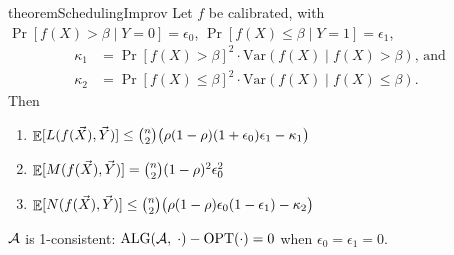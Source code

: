 \begin{restatable}{theorem}{SchedulingImprov} \label{thm: schedule-improv}
    Let $f$ be calibrated, with $\Pr[f(X) > \beta \mid Y=0]=\epsilon_0$, $\Pr[f(X) \leq \beta \mid Y=1]=\epsilon_1$,     \begin{align*}
        \kappa_1 &= \Pr[f(X) > \beta]^2 \cdot \mathrm{Var}(f(X) \mid f(X) > \beta) \text{, and} \\
        \kappa_2 &= \Pr[f(X) \leq \beta]^2 \cdot \mathrm{Var}(f(X) \mid f(X) \leq \beta).
    \end{align*} 
    Then
    \vspace{-3mm}
    \begin{enumerate}
        \itemsep0em 
        \item $\mathop{\mathbb{E}}[L(f(\vec{X}), \vec{Y})] \leq \binom{n}{2}\bigl(\rho(1-\rho)(1+\epsilon_0)\epsilon_1 - \kappa_1\bigr)$
        \item $\mathop{\mathbb{E}}[M(f(\vec{X}), \vec{Y})] = \binom{n}{2}(1-\rho)^2 \epsilon_0^2$
        \item $\mathop{\mathbb{E}}[N(f(\vec{X}), \vec{Y})] \leq \binom{n}{2}\bigl(\rho(1-\rho)\epsilon_0(1-\epsilon_1) - \kappa_2\bigr)$
    \end{enumerate}
\end{restatable}
\begin{remark}
    $\mathcal{A}$ is 1-consistent: $\textnormal{ALG}(\mathcal{A}, \; \cdot) -\textnormal{OPT}(\cdot) = 0$ when $\epsilon_0 = \epsilon_1 = 0$.
\end{remark}